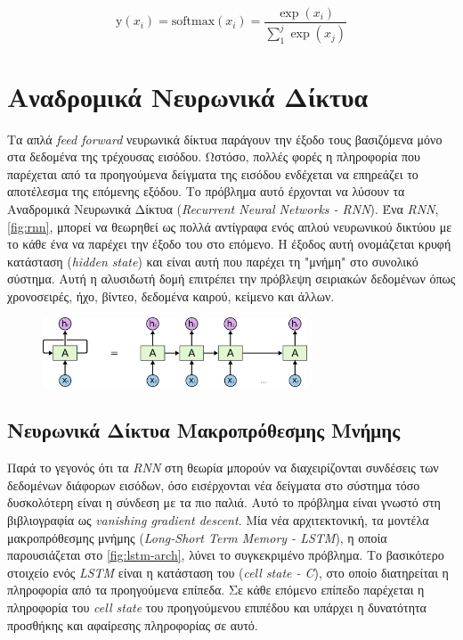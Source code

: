 \begin{equation}
    \label{eq:softmax}
    \text{y}(x_{i}) = \text{softmax}(x_{i}) = \frac{\exp(x_i)}{\sum_1^j \exp(x_j)}
\end{equation}

\section{Αναδρομικά Νευρωνικά Δίκτυα}
Τα απλά \emph{feed forward} νευρωνικά δίκτυα παράγουν την έξοδο τους βασιζόμενα μόνο στα δεδομένα της τρέχουσας εισόδου. Ωστόσο, πολλές φορές η πληροφορία που παρέχεται από τα προηγούμενα δείγματα της εισόδου ενδέχεται να επηρεάζει το αποτέλεσμα της επόμενης εξόδου. Το πρόβλημα αυτό έρχονται να λύσουν τα Αναδρομικά Νευρωνικά Δίκτυα (\emph{Recurrent Neural Networks - RNN}). Ένα \emph{RNN}, \autoref{fig:rnn}, μπορεί να θεωρηθεί ως πολλά αντίγραφα ενός απλού νευρωνικού δικτύου με το κάθε ένα να παρέχει την έξοδο του στο επόμενο. Η έξοδος αυτή ονομάζεται κρυφή κατάσταση (\emph{hidden state}) και είναι αυτή που παρέχει τη "μνήμη" στο συνολικό σύστημα. Αυτή η αλυσιδωτή δομή επιτρέπει την πρόβλεψη σειριακών δεδομένων όπως χρονοσειρές, ήχο, βίντεο, δεδομένα καιρού, κείμενο και άλλων.

\begin{figure}[!ht]
  \centering
  \captionsetup{justification=centering}
  \includegraphics[width=0.7\textwidth]{images/chapter2/rnn.png}
  \label{fig:rnn}
\end{figure}
\noindent

\subsection{Νευρωνικά Δίκτυα Μακροπρόθεσμης Μνήμης}
Παρά το γεγονός ότι τα \emph{RNN} στη θεωρία μπορούν να διαχειρίζονται συνδέσεις των δεδομένων διάφορων εισόδων, όσο εισέρχονται νέα δείγματα στο σύστημα τόσο δυσκολότερη είναι η σύνδεση με τα πιο παλιά. Αυτό το πρόβλημα είναι γνωστό στη βιβλιογραφία ως \emph{vanishing gradient descent}. Μία νέα αρχιτεκτονική, τα μοντέλα μακροπρόθεσμης μνήμης (\emph{Long-Short Term Memory - LSTM}), η οποία παρουσιάζεται στο \autoref{fig:lstm-arch}, λύνει το συγκεκριμένο πρόβλημα. Το βασικότερο στοιχείο ενός \emph{LSTM} είναι η κατάσταση του (\emph{cell state - C}), στο οποίο διατηρείται η πληροφορία από τα προηγούμενα επίπεδα. Σε κάθε επόμενο επίπεδο παρέχεται η πληροφορία του \emph{cell state} του προηγούμενου επιπέδου και υπάρχει η δυνατότητα προσθήκης και αφαίρεσης πληροφορίας σε αυτό.

